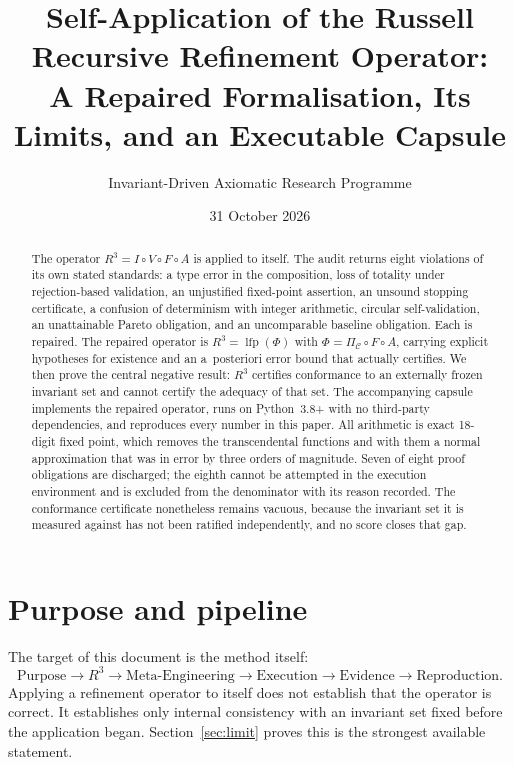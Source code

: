 \documentclass[11pt,a4paper]{article}
\title{Self-Application of the Russell Recursive Refinement Operator:\\
A Repaired Formalisation, Its Limits, and an Executable Capsule}
\author{Invariant-Driven Axiomatic Research Programme}
\date{31 October 2026}
\theoremstyle{plain}
\theoremstyle{definition}
\theoremstyle{remark}
\DeclareMathOperator{\lfp}{lfp}
\newcommand{\Rc}{R^{3}}
\newcommand{\Cfeas}{\mathcal{C}}
\newcommand{\Proj}{\Pi_{\Cfeas}}
\begin{document}
\maketitle

\begin{abstract}
The operator $\Rc = I \circ V \circ F \circ A$ is applied to itself. The audit
returns eight violations of its own stated standards: a type error in the
composition, loss of totality under rejection-based validation, an unjustified
fixed-point assertion, an unsound stopping certificate, a confusion of
determinism with integer arithmetic, circular self-validation, an unattainable
Pareto obligation, and an uncomparable baseline obligation. Each is repaired.
The repaired operator is $\Rc = \lfp(\Phi)$ with $\Phi = \Proj \circ F \circ A$,
carrying explicit hypotheses for existence and an a~posteriori error bound that
actually certifies. We then prove the central negative result: $\Rc$ certifies
conformance to an externally frozen invariant set and cannot certify the
adequacy of that set. The accompanying capsule implements the repaired operator,
runs on Python~3.8+ with no third-party dependencies, and reproduces every
number in this paper. All arithmetic is exact 18-digit fixed point, which
removes the transcendental functions and with them a normal approximation that
was in error by three orders of magnitude. Seven of eight proof obligations are
discharged; the eighth cannot be attempted in the execution environment and is
excluded from the denominator with its reason recorded. The conformance
certificate nonetheless remains vacuous, because the invariant set it is
measured against has not been ratified independently, and no score closes that
gap.
\end{abstract}

\tableofcontents

\section{Purpose and pipeline}
The target of this document is the method itself:
\begin{equation}
\text{Purpose} \rightarrow \Rc \rightarrow \text{Meta-Engineering}
\rightarrow \text{Execution} \rightarrow \text{Evidence} \rightarrow \text{Reproduction}.
\end{equation}
Applying a refinement operator to itself does not establish that the operator is
correct. It establishes only internal consistency with an invariant set fixed
before the application began. Section~\ref{sec:limit} proves this is the
strongest available statement.
\end{document}
